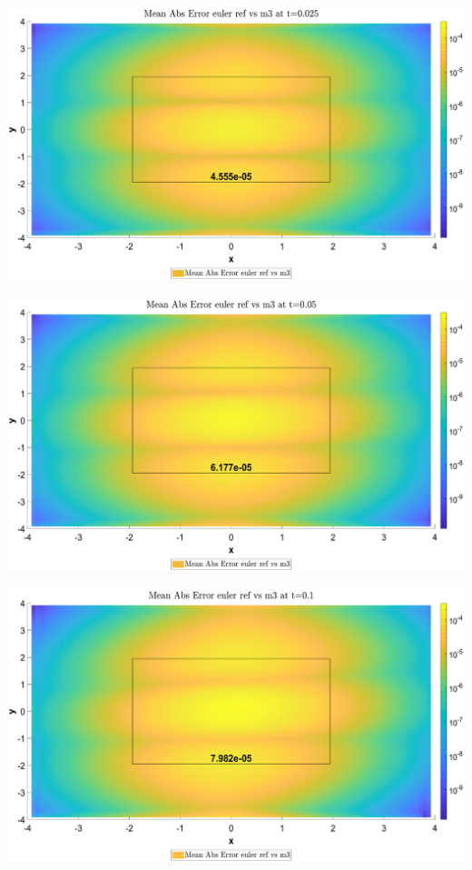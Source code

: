 \begin{landscape}
\includegraphics[width=.95\columnwidth]{CDF/CDFEulerRef_7}
\end{landscape}
\begin{landscape}
\includegraphics[width=.95\columnwidth]{CDF/CDFEulerRef_8}
\end{landscape}
\begin{landscape}
\includegraphics[width=.95\columnwidth]{CDF/CDFEulerRef_9}
\end{landscape}
